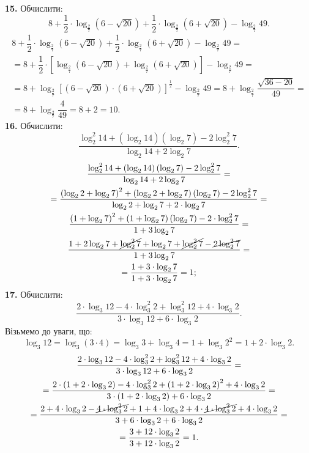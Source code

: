 \textbf{15.} Обчислити:
$$
8+\dfrac{1}{2}\cdot\log_{\frac{2}{7}}\left(6-\sqrt{20}\right)+\dfrac{1}{2}\cdot\log_{\frac{2}{7}}\left(6+\sqrt{20}\right)-\log_{\frac{2}{7}}49.
$$
\begin{multline*}
8+\dfrac{1}{2}\cdot\log_{\frac{2}{7}}\left(6-\sqrt{20}\right)+\dfrac{1}{2}\cdot\log_{\frac{2}{7}}\left(6+\sqrt{20}\right)-\log_{\frac{2}{7}}49=\\
=8+\dfrac{1}{2}\cdot\left[\log_{\frac{2}{7}}\left(6-\sqrt{20}\right)+\log_{\frac{2}{7}}\left(6+\sqrt{20}\right)\right]-\log_{\frac{2}{7}}49=\\
=8+\log_{\frac{2}{7}}\left[\left(6-\sqrt{20}\right)\cdot\left(6+\sqrt{20}\right)\right]^{\frac{1}{2}}-\log_{\frac{2}{7}}49=
8+\log_{\frac{2}{7}}\dfrac{\sqrt{36-20}}{49}=\\
=8+\log_{\frac{2}{7}}\dfrac{4}{49}=8+2=10.
\end{multline*}
\textbf{16.} Обчислити:
$$
\frac{\log^{2}_{2}14+\left(\log_{2}14\right)\left(\log_{2}7\right)-2\log^{2}_{2}7}{\log_{2}14+2\log_{2}7}.
$$
\begin{multline*}
\frac{\log^{2}_{2}14+\left(\log_{2}14\right)\left(\log_{2}7\right)-2\log^{2}_{2}7}{\log_{2}14+2\log_{2}7}=\\
=\frac{\left(\log_{2}2+\log_{2}7\right)^2+\left(\log_{2}2+\log_{2}7\right)\left(\log_{2}7\right)-
2\log^{2}_{2}7}{\log_{2}2+\log_{2}7+2\cdot\log_{2}7}=\\
\frac{\left(1+\log_{2}7\right)^2+\left(1+\log_{2}7\right)\left(\log_{2}7\right)-2\cdot\log^{2}_{2}7}{1+3\log_{2}7}=\\
\frac{1+2\log_{2}7+\cancel{\log^{2}_{2}7}+\log_{2}7+\cancel{\log^{2}_{2}7}-\cancel{2\log^{2}_{2}7}}{1+3\log_{2}7}=\\
=\frac{1+3\cdot\log_{2}7}{1+3\cdot\log_{2}7}=1;
\end{multline*}
\textbf{17.} Обчислити:
$$
\dfrac{2\cdot\log_{3}12-4\cdot\log^{2}_{3}2+\log^{2}_{3}12+4\cdot\log_{3}2}{3\cdot\log_{3}12+6\cdot\log_{3}2}.
$$
Візьмемо до уваги, що:
$$
\log_{3}12=
\log_{3}(3\cdot4)=
\log_{3}3+\log_{3}4=
1+\log_{3}2^2=
1+2\cdot\log_{3}2.
$$
\begin{multline*}
\dfrac{2\cdot\log_{3}12-4\cdot\log^{2}_{3}2+\log^{2}_{3}12+4\cdot\log_{3}2}{3\cdot\log_{3}12+6\cdot\log_{3}2}=\\
=\dfrac{2\cdot\left(1+2\cdot\log_{3}2\right)-4\cdot\log^{2}_{3}2+\left(1+2\cdot\log_{3}2\right)^2+
4\cdot\log_{3}2}{3\cdot\left(1+2\cdot\log_{3}2\right)+6\cdot\log_{3}2}=\\
=\dfrac{2+4\cdot\log_{3}2-\cancel{4\cdot\log^{2}_{3}2}+1+4\cdot\log_{3}2+
4\cdot\cancel{4\cdot\log^{2}_{3}2}+4\cdot\log_{3}2}{3+6\cdot\log_{3}2+6\cdot\log_{3}2}=\\
=\dfrac{3+12\cdot\log_{3}2}{3+12\cdot\log_{3}2}=1.
\end{multline*}
